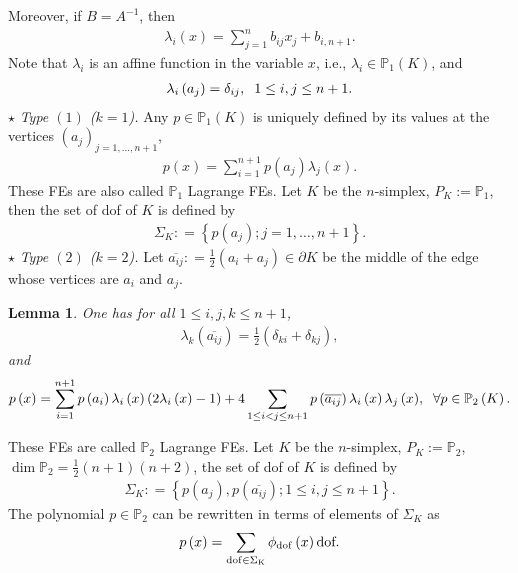 \documentclass[11pt,a4paper,center,notitlepage]{article}
\numberwithin{equation}{section}
\newtheorem{lemma}{Lemma}[section]
\begin{document}
Moreover, if $B=A^{-1}$, then 
\begin{align}
{\lambda _i}\left( x \right) = \sum\limits_{j = 1}^n {{b_{ij}}{x_j}}  + {b_{i,n + 1}}.
\end{align}
Note that $\lambda _i$ is an affine function in the variable $x$, i.e., $\lambda _i\in \mathbb{P}_1\left(K\right)$, and 
\begin{align}
{\lambda _i}\left( {{a_j}} \right) = {\delta _{ij}},\hspace{2mm} 1 \le i,j \le n + 1.
\end{align}
$\star$ \textit{Type $\left(1\right)$ ($k=1$).} Any $p\in \mathbb{P}_1\left(K\right)$ is uniquely defined by its values at the vertices $\left(a_j\right)_{j=1,\ldots,n+1}$, 
\begin{align}
p\left( x \right) = \sum\limits_{i = 1}^{n + 1} {p\left( {{a_j}} \right){\lambda _j}\left( x \right)} .
\end{align}
These FEs are also called $\mathbb{P}_1$ Lagrange FEs. Let $K$ be the $n$-simplex, $P_K:=\mathbb{P}_1$, then the set of dof of $K$ is defined by
\begin{align}
{\Sigma _K}: = \left\{ {p\left( {{a_j}} \right);j = 1, \ldots ,n + 1} \right\} .
\end{align}
$\star$ \textit{Type $\left(2\right)$ ($k=2$).} Let $\overline {{a_{ij}}} : = \frac{1}{2}\left( {{a_i} + {a_j}} \right)\in \partial K$ be the middle of the edge whose vertices are $a_i$ and $a_j$.
\begin{lemma}
One has for all $1\le i,j,k\le n+1$,
\begin{align}
{\lambda _k}\left( {\overline {{a_{ij}}} } \right) = \frac{1}{2}\left( {{\delta _{ki}} + {\delta _{kj}}} \right),
\end{align}
and
\begin{align}
p\left( x \right) = \sum\limits_{i = 1}^{n + 1} {p\left( {{a_i}} \right){\lambda _i}\left( x \right)\left( {2{\lambda _i}\left( x \right) - 1} \right)}  + 4\sum\limits_{1 \le i < j \le n + 1} {p\left( {\overline {{a_{ij}}} } \right){\lambda _i}\left( x \right){\lambda _j}\left( x \right)} ,\hspace{2mm} \forall p \in {\mathbb{P}_2}\left( K \right).
\end{align}
\end{lemma}
These FEs are called $\mathbb{P}_2$ Lagrange FEs. Let $K$ be the $n$-simplex, $P_K:=\mathbb{P}_2$, $\dim \mathbb{P}_2=\frac{1}{2}\left(n+1\right)\left(n+2\right)$, the set of dof of $K$ is defined by 
\begin{align}
{\Sigma _K}: = \left\{ {p\left( {{a_j}} \right),p\left( {\overline {{a_{ij}}} } \right);1 \le i,j \le n + 1} \right\}.
\end{align}
The polynomial $p\in \mathbb{P}_2$ can be rewritten in terms of elements of $\Sigma _K$ as
\begin{align}
p\left( x \right) = \sum\limits_{\rm{dof } \in {\Sigma _K}} {{\phi _{\rm dof}}\left( x \right)\mbox{dof}} .
\end{align}
\end{document}

